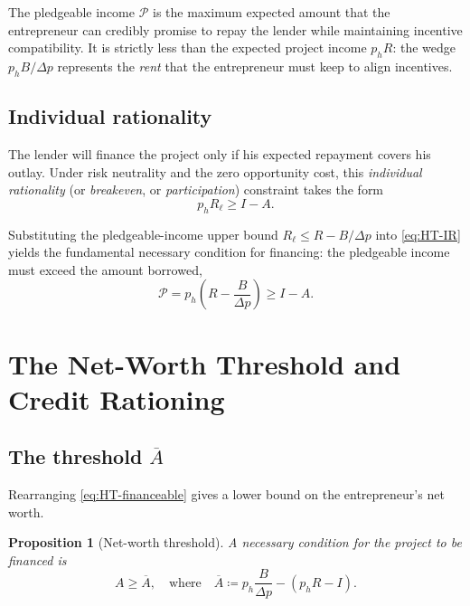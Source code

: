 \documentclass[11pt,a4paper,oneside]{book}
\def\leq{\leqslant}
\def\geq{\geqslant}
\theoremstyle{plain}
\newtheorem{proposition}[theorem]{Proposition}
\theoremstyle{definition}
\theoremstyle{remark}
\numberwithin{equation}{chapter}
\begin{document}
The pledgeable income $\mathcal{P}$ is the maximum expected amount that the entrepreneur can credibly promise to repay the lender while maintaining incentive compatibility.
It is strictly less than the expected project income $p_h R$: the wedge $p_h B / \Delta p$ represents the \emph{rent} that the entrepreneur must keep to align incentives.

\subsection{Individual rationality}

The lender will finance the project only if his expected repayment covers his outlay.
Under risk neutrality and the zero opportunity cost, this \emph{individual rationality} (or \emph{breakeven}, or \emph{participation}) constraint takes the form
\begin{equation}\label{eq:HT-IR}
  p_h R_\ell \geq I - A.
  \tag{IR}
\end{equation}

Substituting the pledgeable-income upper bound $R_\ell \leq R - B/\Delta p$ into \eqref{eq:HT-IR} yields the fundamental necessary condition for financing: the pledgeable income must exceed the amount borrowed,
\begin{equation}\label{eq:HT-financeable}
  \mathcal{P} = p_h \left( R - \frac{B}{\Delta p} \right) \geq I - A.
\end{equation}

\section{The Net-Worth Threshold and Credit Rationing}
\label{sec:HT-threshold}

\subsection{The threshold \texorpdfstring{$\overline{A}$}{A-bar}}

Rearranging \eqref{eq:HT-financeable} gives a lower bound on the entrepreneur's net worth.

\begin{proposition}[Net-worth threshold]\label{prop:HT-threshold}
A necessary condition for the project to be financed is
\begin{equation}\label{eq:HT-threshold}
  A \geq \overline{A}, \quad \text{where} \quad \overline{A} \coloneqq p_h \frac{B}{\Delta p} - (p_h R - I).
\end{equation}
\end{proposition}
\end{document}
